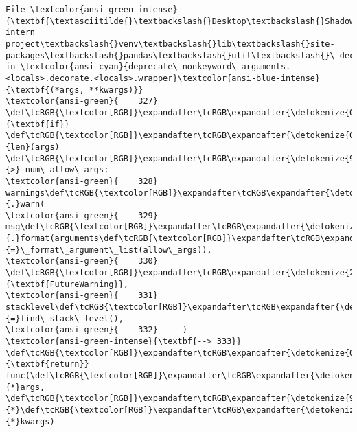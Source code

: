 \documentclass[11pt]{article}
\begin{document}
\begin{Verbatim}[commandchars=\\\{\}, frame=single, framerule=2mm, rulecolor=\color{outerrorbackground}]
File \textcolor{ansi-green-intense}{\textbf{\textasciitilde{}\textbackslash{}Desktop\textbackslash{}Shadowfox intern project\textbackslash{}venv\textbackslash{}lib\textbackslash{}site-packages\textbackslash{}pandas\textbackslash{}util\textbackslash{}\_decorators.py:333}}, in \textcolor{ansi-cyan}{deprecate\_nonkeyword\_arguments.<locals>.decorate.<locals>.wrapper}\textcolor{ansi-blue-intense}{\textbf{(*args, **kwargs)}}
\textcolor{ansi-green}{    327} \def\tcRGB{\textcolor[RGB]}\expandafter\tcRGB\expandafter{\detokenize{0,135,0}}{\textbf{if}} \def\tcRGB{\textcolor[RGB]}\expandafter\tcRGB\expandafter{\detokenize{0,135,0}}{len}(args) \def\tcRGB{\textcolor[RGB]}\expandafter\tcRGB\expandafter{\detokenize{98,98,98}}{>} num\_allow\_args:
\textcolor{ansi-green}{    328}     warnings\def\tcRGB{\textcolor[RGB]}\expandafter\tcRGB\expandafter{\detokenize{98,98,98}}{.}warn(
\textcolor{ansi-green}{    329}         msg\def\tcRGB{\textcolor[RGB]}\expandafter\tcRGB\expandafter{\detokenize{98,98,98}}{.}format(arguments\def\tcRGB{\textcolor[RGB]}\expandafter\tcRGB\expandafter{\detokenize{98,98,98}}{=}\_format\_argument\_list(allow\_args)),
\textcolor{ansi-green}{    330}         \def\tcRGB{\textcolor[RGB]}\expandafter\tcRGB\expandafter{\detokenize{215,95,95}}{\textbf{FutureWarning}},
\textcolor{ansi-green}{    331}         stacklevel\def\tcRGB{\textcolor[RGB]}\expandafter\tcRGB\expandafter{\detokenize{98,98,98}}{=}find\_stack\_level(),
\textcolor{ansi-green}{    332}     )
\textcolor{ansi-green-intense}{\textbf{--> 333}} \def\tcRGB{\textcolor[RGB]}\expandafter\tcRGB\expandafter{\detokenize{0,135,0}}{\textbf{return}} func(\def\tcRGB{\textcolor[RGB]}\expandafter\tcRGB\expandafter{\detokenize{98,98,98}}{*}args, \def\tcRGB{\textcolor[RGB]}\expandafter\tcRGB\expandafter{\detokenize{98,98,98}}{*}\def\tcRGB{\textcolor[RGB]}\expandafter\tcRGB\expandafter{\detokenize{98,98,98}}{*}kwargs)


\end{Verbatim}
\end{document}
